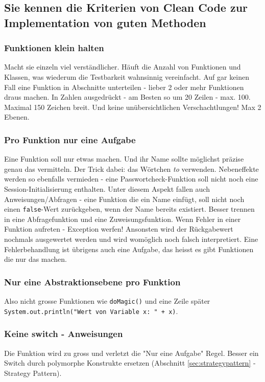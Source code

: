 \subsection{Sie kennen die Kriterien von Clean Code zur Implementation von guten Methoden}

\subsubsection{Funktionen klein halten}
Macht sie einzeln viel verständlicher. Häuft die Anzahl von Funktionen und Klassen, was wiederum die Testbarkeit wahnsinnig vereinfacht. Auf gar keinen Fall eine Funktion in Abschnitte unterteilen - lieber 2 oder mehr Funktionen draus machen.
In Zahlen ausgedrückt - am Besten so um 20 Zeilen - max. 100. Maximal 150 Zeichen breit. Und keine unübersichtlichen Verschachtlungen! Max 2 Ebenen.

\subsubsection{Pro Funktion nur eine Aufgabe}
Eine Funktion soll nur etwas machen.  Und ihr Name sollte möglichst präzise genau das vermitteln. Der Trick dabei: das Wörtchen \emph{to} verwenden.  
Nebeneffekte werden so ebenfalls vermieden - eine Passwortcheck-Funktion soll nicht noch eine Session-Initialisierung enthalten. 
Unter diesem Aspekt fallen auch Anweisungen/Abfragen - eine Funktion die ein Name einfügt, soll nicht noch einen \texttt{false}-Wert zurückgeben, wenn der Name bereits existiert. Besser trennen in eine Abfragefunktion und eine Zuweisungsfunktion. 
Wenn Fehler in einer Funktion aufreten - Exception werfen! Ansonsten wird der Rückgabewert nochmals ausgewertet werden und wird womöglich noch falsch interpretiert.
Eine Fehlerbehandlung ist übrigens auch eine Aufgabe, das heisst es gibt Funktionen die nur das machen.

\subsubsection{Nur eine Abstraktionsebene pro Funktion}
Also nicht grosse Funktionen wie \texttt{doMagic()} und eine Zeile später \texttt{System.out.println("Wert von Variable x: " + x)}.

\subsubsection{Keine switch - Anweisungen}
Die Funktion wird zu gross und verletzt die "Nur eine Aufgabe" Regel. Besser ein Switch durch polymorphe Konstrukte ersetzen (Abschnitt \ref{sec:strategypattern} - Strategy Pattern).

